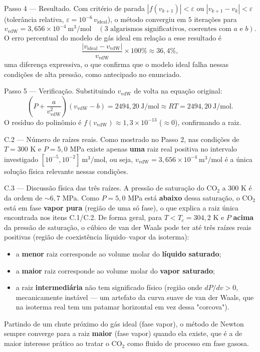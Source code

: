 \documentclass[
	12pt,				%
	openright,			%
	a4paper,			%
	english,			%
	french,				%
	spanish,			%
	brazil,				%
	]{abntex2}
\begin{document}
{Passo 4 --- Resultado.}
Com critério de parada $|f(v_{k+1})|<\varepsilon$ ou $|v_{k+1}-v_k|<\varepsilon$ (tolerância relativa, $\varepsilon = 10^{-6}\,v_{\text{ideal}}$), o método convergiu em $5$ iterações para
\[
v_{\text{vdW}} = 3{,}656\times10^{-4}\ \text{m}^3/\text{mol} \quad (3\text{ algarismos significativos, coerentes com } a \text{ e } b).
\]
O erro percentual do modelo de gás ideal em relação a esse resultado é
\[
\frac{|v_{\text{ideal}} - v_{\text{vdW}}|}{v_{\text{vdW}}}\times100\% \approx 36{,}4\%,
\]
uma diferença expressiva, o que confirma que o modelo ideal falha nessas condições de alta pressão, como antecipado no enunciado.

{Passo 5 --- Verificação.}
Substituindo $v_{\text{vdW}}$ de volta na equação original:
\[
\left(P+\frac{a}{v_{\text{vdW}}^2}\right)(v_{\text{vdW}}-b) = 2494{,}20\ \text{J/mol} \approx RT = 2494{,}20\ \text{J/mol}.
\]
O resíduo do polinômio é $f(v_{\text{vdW}}) \approx 1{,}3\times10^{-13}$ ($\approx 0$), confirmando a raiz.

{C.2 --- Número de raízes reais.}
Como mostrado no Passo 2, nas condições de $T=300$ K e $P=5{,}0$ MPa existe apenas \textbf{uma} raiz real positiva no intervalo investigado $[10^{-5}, 10^{-2}]\ \text{m}^3/\text{mol}$, ou seja, $v_{\text{vdW}}=3{,}656\times10^{-4}\ \text{m}^3/\text{mol}$ é a única solução física relevante nessas condições.

{C.3 --- Discussão física das três raízes.}
A pressão de saturação do $\text{CO}_2$ a $300$ K é da ordem de $\sim 6{,}7$ MPa. Como $P = 5{,}0$ MPa está \textbf{abaixo} dessa saturação, o $\text{CO}_2$ está em fase \textbf{vapor pura} (região de uma só fase), o que explica a raiz única encontrada nos itens C.1/C.2. De forma geral, para $T<T_c=304{,}2$ K e $P$ \textbf{acima} da pressão de saturação, o cúbico de van der Waals pode ter até três raízes reais positivas (região de coexistência líquido--vapor da isoterma):
\begin{itemize}
    \item a \textbf{menor} raiz corresponde ao volume molar do \textbf{líquido saturado};
    \item a \textbf{maior} raiz corresponde ao volume molar do \textbf{vapor saturado};
    \item a raiz \textbf{intermediária} não tem significado físico (região onde $dP/dv>0$, mecanicamente instável --- um artefato da curva suave de van der Waals, que na isoterma real tem um patamar horizontal em vez dessa "corcova").
\end{itemize}
Partindo de um chute próximo do gás ideal (fase vapor), o método de Newton sempre converge para a raiz \textbf{maior} (fase vapor) quando ela existe, que é a de maior interesse prático ao tratar o $\text{CO}_2$ como fluido de processo em fase gasosa.
\end{document}
